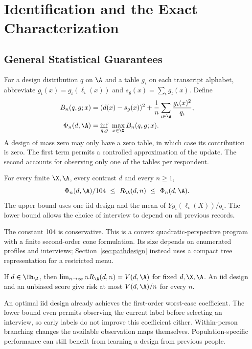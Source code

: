 \section{Identification and the Exact Characterization}\label{app:B}
\subsection{General Statistical Guarantees}\label{app:generalstatements}
For a design distribution $q$ on $\A$ and a table $g_\iota$ on each transcript alphabet, abbreviate $g_\iota(x)=g_\iota(\ell_\iota(x))$ and $s_g(x)=\sum_\iota g_\iota(x)$. Define
\begin{align}
 B_n(q,g;x)&=(d(x)-s_g(x))^2+
              \frac1n\sum_{\iota\in\A}\frac{g_\iota(x)^2}{q_\iota},\nonumber\\
 \Phi_n(d,\A)&=\inf_{q,g}\ \max_{x\in\X}B_n(q,g;x).
 \label{eq:program}
\end{align}
A design of mass zero may only have a zero table, in which case its contribution is zero. The first term permits a controlled approximation of the update. The second accounts for observing only one of the tables per respondent.

\begin{theorem}\label{thm:finite}
For every finite $\X,\A$, every contrast $d$ and every $n\ge1$,
\[
       \Phi_n(d,\A)/104 \ \le\ R_\A(d,n)\ \le\ \Phi_n(d,\A).
\]
The upper bound uses one iid design and the mean of $Yg_\iota(\ell_\iota(X))/q_\iota$. The lower bound allows the choice of interview to depend on all previous records.
\end{theorem}

The constant 104 is conservative. This is a convex quadratic-perspective program with a finite second-order cone formulation. Its size depends on enumerated profiles and interviews; Section~\ref{sec:pathdesign} instead uses a compact tree representation for a restricted menu.

\begin{samepage}
\begin{theorem}\label{thm:asym}
If $d\in\Hh_{\A}$, then $\lim_{n\to\infty}nR_\A(d,n)=V(d,\A)$ for fixed $d,\X,\A$. An iid design and an unbiased score give risk at most $V(d,\A)/n$ for every $n$.
\end{theorem}
\end{samepage}

An optimal iid design already achieves the first-order worst-case coefficient. The lower bound even permits observing the current label before selecting an interview, so early labels do not improve this coefficient either. Within-person branching changes the available observation maps themselves. Population-specific performance can still benefit from learning a design from previous people.

